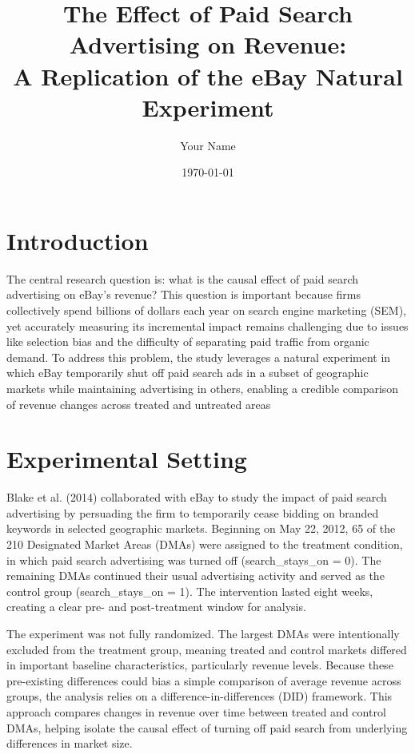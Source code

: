 \documentclass[12pt]{article}
\title{The Effect of Paid Search Advertising on Revenue: \\
A Replication of the eBay Natural Experiment}
\author{Your Name}
\date{\today}
\begin{document}
\maketitle
\section{Introduction}

The central research question is: what is the causal effect of paid search advertising on eBay’s revenue? This question is important because firms collectively spend billions of dollars each year on search engine marketing (SEM), yet accurately measuring its incremental impact remains challenging due to issues like selection bias and the difficulty of separating paid traffic from organic demand. To address this problem, the study leverages a natural experiment in which eBay temporarily shut off paid search ads in a subset of geographic markets while maintaining advertising in others, enabling a credible comparison of revenue changes across treated and untreated areas

\section{Experimental Setting}

Blake et al. (2014) collaborated with eBay to study the impact of paid search advertising by persuading the firm to temporarily cease bidding on branded keywords in selected geographic markets. Beginning on May 22, 2012, 65 of the 210 Designated Market Areas (DMAs) were assigned to the treatment condition, in which paid search advertising was turned off (search\_stays\_on = 0). The remaining DMAs continued their usual advertising activity and served as the control group (search\_stays\_on = 1). The intervention lasted eight weeks, creating a clear pre- and post-treatment window for analysis.

The experiment was not fully randomized. The largest DMAs were intentionally excluded from the treatment group, meaning treated and control markets differed in important baseline characteristics, particularly revenue levels. Because these pre-existing differences could bias a simple comparison of average revenue across groups, the analysis relies on a difference-in-differences (DID) framework. This approach compares changes in revenue over time between treated and control DMAs, helping isolate the causal effect of turning off paid search from underlying differences in market size.
\end{document}
